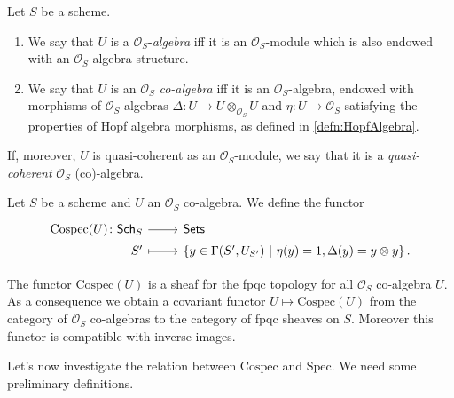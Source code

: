 \documentclass[../Main]{subfiles}
\begin{document}
\begin{defn}
	Let $S$ be a scheme.
\begin{enumerate}
\item We say that $U$ is a $\mathcal{O}_{ S }$-{\em algebra}
	iff it is an $\mathcal{O}_{ S }$-module
	which is also endowed with an $\mathcal{O}_{ S }$-algebra structure.
\item We say that $U$ is an $\mathcal{O}_{ S }$ {\em co-algebra}
	iff it is an $\mathcal{O}_{ S }$-algebra, endowed with
	morphisms of $\mathcal{O}_S$-algebras
	$\Delta\colon U \to U \otimes_{\mathcal{O}_{ S }} U$
	and $\eta\colon U \to \mathcal{O}_{ S }$
	satisfying the properties of Hopf algebra morphisms,
	as defined in \cref{defn:HopfAlgebra}.
\end{enumerate}
	If, moreover, $U$ is quasi-coherent as an $\mathcal{O}_{ S }$-module,
	we say that it is a {\em quasi-coherent} $\mathcal{O}_{ S }$ (co)-algebra.
\end{defn}


\begin{defn}[]
	Let $S$ be a scheme and $U$ an $\mathcal{O}_{ S }$ co-algebra.
	We define the functor 
	\begin{equation*}
	\begin{tikzcd}[row sep = 0ex
		,/tikz/column 1/.append style={anchor=base east}
		,/tikz/column 2/.append style={anchor=base west}]
		\mathrm{Cospec}(U)\colon 
		\mathsf{Sch}_{ S }\arrow[r, "", rightarrow] &
		\mathsf{Sets} \\
		S' \arrow[r, "", mapsto] & 
		\left\{ y \in \Gamma(S', U_{S'}) \ \middle|\ 
		\eta(y) = 1, \Delta(y) = y \otimes y\right\}
	.\end{tikzcd}
	\end{equation*} 
\end{defn}


\begin{rem}
	The functor $\mathrm{Cospec}(U)$ is a sheaf for the fpqc topology
	for all $\mathcal{O}_{ S }$ co-algebra $U$.
	As a consequence we obtain a covariant functor $U \mapsto \mathrm{Cospec}(U)$
	from the category of $\mathcal{O}_{ S }$ co-algebras to the category
	of fpqc sheaves on $S$.
	Moreover this functor is compatible with inverse images.
\end{rem}


\noindent
Let's now investigate the relation between $\mathrm{Cospec}$ and $\mathrm{Spec}$.
We need some preliminary definitions.
\end{document}
